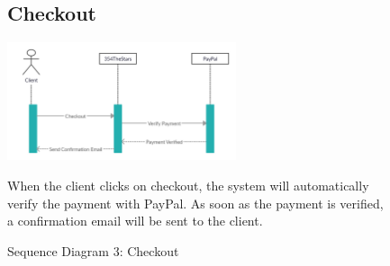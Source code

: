 \documentclass[11pt]{article}
\begin{document}
\begin{figure}[ht!]
    \subsection{Checkout}
    \centering
    \includegraphics[width=0.6\textwidth,height=0.15\paperheight]{Diagrams/Sequence/Checkout.jpg}
    \caption{Sequence Diagram 3: Checkout}
    \label{fig: Checkout}
    \begin{justify}
        When the client clicks on checkout, the system will automatically verify the payment with PayPal. As soon as the payment is verified, a confirmation email will be sent to the client.
    \end{justify}
\end{figure}
\end{document}
